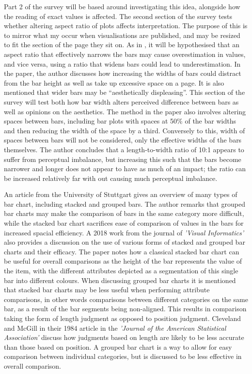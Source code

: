 \documentclass[
  12pt,
]{book}
\begin{document}
Part 2 of the survey will be based around investigating this idea,
alongside how the reading of exact values is affected. The second
section of the survey tests whether altering aspect ratio of plots
affects interpretation. The purpose of this is to mirror what my occur
when visualisations are published, and may be resized to fit the section
of the page they sit on. As in \citep{Few2016}, it will be hypothesised
that an aspect ratio that effectively narrows the bars may cause
overestimation in values, and vice versa, using a ratio that widens bars
could lead to underestimation. In the paper, the author discusses how
increasing the widths of bars could distract from the bar height as well
as take up excessive space on a page. It is also mentioned that wider
bars may be ``aesthetically displeasing''. This section of the survey
will test both how bar width alters perceived difference between bars as
well as opinions on the aesthetics. The method in the paper also
involves altering spaces between bars, including bar plots with spaces
at 50\% of the bar widths and then reducing the width of the space by a
third. Conversely to this, width of spaces between bars will not be
considered, only the effective widths of the bars themselves. The author
concludes that a length-to-width ratio of 10:1 appears to suffer from
perceptual imbalance, but increasing this such that the bars become
narrower and longer does not appear to have as much of an impact; the
ratio can be increased relatively far with out causing much perceptual
imbalance.

An article from the University of Stuttgart \citep{HuynhHaiDang2017}
gives an overview of many types of bar chart, including stacked and
grouped bars. The author remarks that grouped bar charts may make the
comparison of bars in the same category more difficult, while the
stacked bar chart sacrifices ease of comparison of values in the bars
for increased spacial efficiency. A 2018 work from the journal of
\textit{'Visual Informatics'} \citep{INDRATMO2018155} also provides a
discussion on the use of various forms of stacked and grouped bar charts
and their efficacy. The paper notes how a classical stacked bar chart
can be useful for overall comparisons as the height of the bar
represents the value of the item, with the different attributes depicted
as a segmentation of this single bar into different colours. When
discussing grouped bar charts it is mentioned that stacked bar charts
may be less useful when performing attribute comparisons, in other words
comparisons between different categories on the same bar, as a result of
the bar segments being non-aligned. This results in comparison taking
the form of length judgment as opposed to position judgment. Cleveland
and McGill in their 1984 article in the
\textit{'Journal of the American Statistical Association'}
\citep{clevelandmcgill} discuss how judgments based on length are likely
to be less accurate than those based on position. A grouped bar chart is
a way to allow for easy comparison between individual categories, but is
discussed to be less effective in overall comparison.

\backmatter
  
\end{document}
